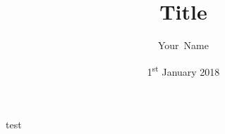 



\title{Title}
\newcommand{\Year}{2018}
\date{1\textsuperscript{st} January \Year}
\newcommand{\thesisKind}{Bachelor}
\newcommand{\degree}{Bachelor~of~Science}
\newcommand{\versionnumber}{0.1}

\author{Your~Name}
\newcommand{\matrikelno}{1234567}
\newcommand{\email}{your.name@fu-berlin.de}

\newcommand{\supervisor}{Nicolas~Lehmann}
\newcommand{\supervisorUniversity}{Freie Universität Berlin}
\newcommand{\supervisorDepartment}{Dept. of Computer Science and Mathematics}
\newcommand{\supervisorAG}{Databases and Information Systems Group}
\newcommand{\supervisorCountry}{Germany}

\newcommand{\fstAdvisor}{Prof.~Dr.~Agnès~Voisard}
\newcommand{\fstAdvisorsUniversity}{Freie Universität Berlin}
\newcommand{\fstAdvisorsDepartment}{Dept. of Computer Science and Mathematics}
\newcommand{\fstAdvisorsAG}{Databases and Information Systems Group}
\newcommand{\fstAdvisorsCountry}{Germany}

\newcommand{\sndAdvisor}{Prof.~Dr.~Heinz~Schweppe}
\newcommand{\sndAdvisorsUniversity}{Freie Universität Berlin} %
\newcommand{\sndAdvisorsDepartment}{Dept. of Computer Science and Mathematics}
\newcommand{\sndAdvisorsAG}{Databases and Information Systems Group}
\newcommand{\sndAdvisorsCountry}{Germany}



    test


